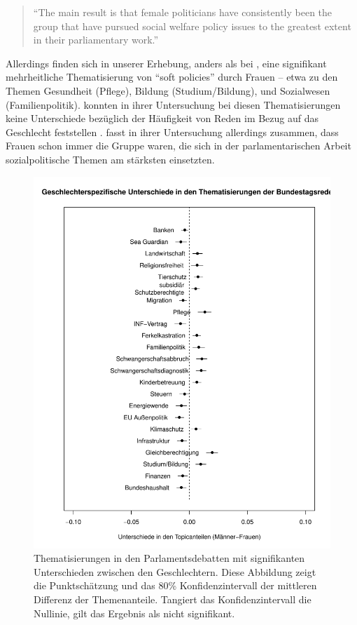 \documentclass[12pt, 
    twoside=false, 
    bibliography=totoc, 
    numbers=endperiod, 
    headings=normal, 
    toc=chapterentrydotfill
    ]{scrbook}
\begin{document}
\begin{quote}
    \enquote{The main result is that female politicians have consistently been the group that have pursued social welfare policy issues to the greatest extent in their parliamentary work.} \parencite[82]{wangnerud_2000}
\end{quote}

Allerdings finden sich in unserer Erhebung, anders als bei \textcite{back_2014}, eine signifikant mehrheitliche Thematisierung von \enquote{soft policies} \parencite[510]{back_2014} durch Frauen -- etwa zu den Themen Gesundheit (Pflege), Bildung (Studium/Bildung), und Sozialwesen (Familienpolitik). \textcite{back_2014} konnten in ihrer Untersuchung bei diesen Thematisierungen keine Unterschiede bezüglich der Häufigkeit von Reden im Bezug auf das Geschlecht feststellen \parencite[512]{back_2014}. \textcite{wangnerud_2000} fasst in ihrer Untersuchung allerdings zusammen, dass Frauen schon immer die Gruppe waren, die sich in der parlamentarischen Arbeit sozialpolitische Themen am stärksten einsetzten.

\begin{figure}[H]
    \centering
    \includegraphics[scale=0.6]{images/stm_differences_top.pdf}
    \caption[Thematisierungen in den Parlamentsdebatten mit signifikanten Unterschieden zwischen den Geschlechtern]{Thematisierungen in den Parlamentsdebatten mit signifikanten Unterschieden zwischen den Geschlechtern. Diese Abbildung zeigt die Punktschätzung und das 80\% Konfidenzintervall der mittleren Differenz der Themenanteile. Tangiert das Konfidenzintervall die Nullinie, gilt das Ergebnis als nicht signifikant.}
    \label{fig:differences_stm_top}
\end{figure}
\end{document}
